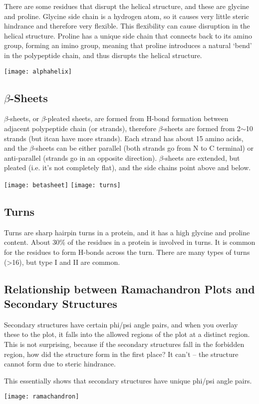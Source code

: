 There are some residues that disrupt the helical structure, and these are glycine and proline.
Glycine side chain is a hydrogen atom, so it causes very little steric hindrance and therefore very flexible.
This flexibility can cause disruption in the helical structure.
Proline has a unique side chain that connects back to its amino group, forming an imino group, meaning that proline introduces a natural `bend' in the polypeptide chain, and thus disrupts the helical structure.

\begin{center}
\texttt{[image: alphahelix]}
\end{center}

\subsection{$\beta$-Sheets}

$\beta$-sheets, or $\beta$-pleated sheets, are formed from H-bond formation between adjacent polypeptide chain (or strands), therefore $\beta$-sheets are formed from 2$\sim$10 strands (but itcan have more strands).
Each strand has about 15 amino acids, and the $\beta$-sheets can be either parallel (both strands go from N to C terminal) or anti-parallel (strands go in an opposite direction).
$\beta$-sheets are extended, but pleated (i.e. it's not completely flat), and the side chains point above and below.

\begin{center}
\texttt{[image: betasheet]}
\texttt{[image: turns]}
\end{center}

\subsection{Turns}

Turns are sharp hairpin turns in a protein, and it has a high glycine and proline content.
About 30\% of the residues in a protein is involved in turns.
It is common for the residues to form H-bonds across the turn.
There are many types of turns (\textgreater16), but type I and II are common.

\subsection{Relationship between Ramachandron Plots and Secondary Structures}

Secondary structures have certain phi/psi angle pairs, and when you overlay these to the plot, it falls into the allowed regions of the plot at a distinct region.
This is not surprising, because if the secondary structures fall in the forbidden region, how did the structure form in the first place?
It can't -- the structure cannot form due to steric hindrance.

This essentially shows that secondary structures have unique phi/psi angle pairs.

\texttt{[image: ramachandron]}

